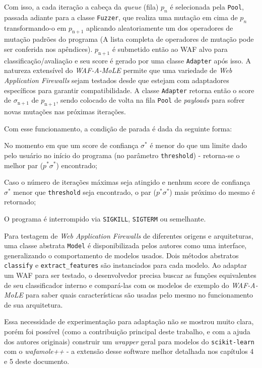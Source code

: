 Com isso, a cada iteração a cabeça da \textit{queue} (fila) $p_n$ é selecionada pela \verb+Pool+, passada adiante para a classe \verb+Fuzzer+, que realiza uma mutação em cima de $p_n$ transformando-o em $p_{\mathrm{n+1}}$ aplicando aleatoriamente um dos operadores de mutação padrões do programa (A lista completa de operadores de mutação pode ser conferida nos apêndices). $p_{\mathrm{n+1}}$ é submetido então ao WAF alvo para classificação/avaliação e seu score é gerado por uma classe \verb+Adapter+ após isso. A natureza extensível do \textit{WAF-A-MoLE} permite que uma variedade de \textit{Web Application Firewalls} sejam testados desde que estejam com adaptadores específicos para garantir compatibilidade. A classe \verb+Adapter+ retorna então o score de $\sigma_{\mathrm{n+1}}$ de $p_{\mathrm{n+1}}$, sendo colocado de volta na fila \verb+Pool+ de \textit{payloads} para sofrer novas mutações nas próximas iterações.

\bigskip 

Com esse funcionamento, a condição de parada é dada da seguinte forma:
\begin{alineas}
\item No momento em que um score de confiança $\sigma^*$ é menor do que um limite dado pelo usuário no início do programa (no parâmetro \verb+threshold+) - retorna-se o melhor par ($p^* \sigma^*$) encontrado;
\item Caso o número de iterações máximas seja atingido e nenhum score de confiança $\sigma^*$ menor que \verb+threshold+ seja encontrado, o par ($p^* \sigma^*$) mais próximo do mesmo é retornado;
\item O programa é interrompido via \verb+SIGKILL+, \verb+SIGTERM+ ou semelhante.
\end{alineas}

\bigskip

Para testagem de \textit{Web Application Firewalls} de diferentes origens e arquiteturas, uma classe abstrata \verb+Model+ é disponibilizada pelos autores como uma interface, generalizando o comportamento de modelos usados. Dois métodos abstratos \verb+classify+ e \verb+extract_features+ são instanciados para cada modelo. Ao adaptar um WAF para ser testado, o desenvolvedor precisa buscar as funções equivalentes de seu classificador interno e compará-las com os modelos de exemplo do \textit{WAF-A-MoLE} para saber quais características são usadas pelo mesmo no funcionamento de sua arquitetura.

Essa necessidade de experimentação para adaptação não se mostrou muito clara, porém foi possível (como a contribuição principal deste trabalho, e com a ajuda dos autores originais) construir um \textit{wrapper} geral para modelos do \verb+scikit-learn+ com o \textit{wafamole++} - a extensão desse software melhor detalhada nos capítulos 4 e 5 deste documento.

